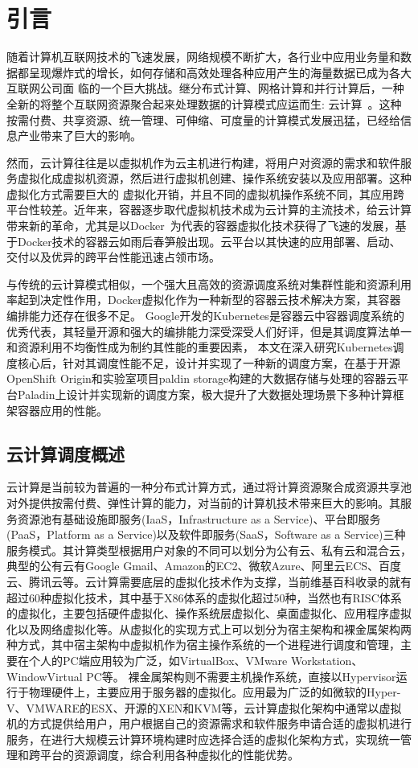 \chapter{引言}
随着计算机互联网技术的飞速发展，网络规模不断扩大，各行业中应用业务量和数据都呈现爆炸式的增长，如何存储和高效处理各种应用产生的海量数据已成为各大互联网公司面
临的一个巨大挑战。继分布式计算、网格计算和并行计算后，一种全新的将整个互联网资源聚合起来处理数据的计算模式应运而生: 云计算~\cite{Hayes2008Cloud}。这种按需付费、共享资源、统一管理、可伸缩、可度量的计算模式发展迅猛，已经给信息产业带来了巨大的影响。

然而，云计算往往是以虚拟机作为云主机进行构建，将用户对资源的需求和软件服务虚拟化成虚拟机资源，然后进行虚拟机创建、操作系统安装以及应用部署。这种虚拟化方式需要巨大的
虚拟化开销，并且不同的虚拟机操作系统不同，其应用跨平台性较差。近年来，容器逐步取代虚拟机技术成为云计算的主流技术，给云计算带来新的革命，尤其是以Docker~\cite{2015Docker}为代表的容器虚拟化技术获得了飞速的发展，基于Docker技术的容器云如雨后春笋般出现。云平台以其快速的应用部署、启动、交付以及优异的跨平台性能迅速占领市场。

与传统的云计算模式相似，一个强大且高效的资源调度系统对集群性能和资源利用率起到决定性作用，Docker虚拟化作为一种新型的容器云技术解决方案，其容器编排能力还存在很多不足。
Google开发的Kubernetes是容器云中容器调度系统的优秀代表，其轻量开源和强大的编排能力深受深受人们好评，但是其调度算法单一和资源利用不均衡性成为制约其性能的重要因素，
本文在深入研究Kubernetes调度核心后，针对其调度性能不足，设计并实现了一种新的调度方案，在基于开源OpenShift Origin和实验室项目paldin storage构建的大数据存储与处理的容器云平台Paladin上设计并实现新的调度方案，极大提升了大数据处理场景下多种计算框架容器应用的性能。

\section{云计算调度概述}
云计算是当前较为普遍的一种分布式计算方式，通过将计算资源聚合成资源共享池对外提供按需付费、弹性计算的能力，对当前的计算机技术带来巨大的影响。其服务资源池有基础设施即服务(IaaS，Infrastructure as a Service)、平台即服务(PaaS，Platform as a Service)以及软件即服务(SaaS，Software as a Service)三种服务模式。其计算类型根据用户对象的不同可以划分为公有云、私有云和混合云，典型的公有云有Google Gmail、Amazon的EC2、微软Azure、阿里云ECS、百度云、腾讯云等。云计算需要底层的虚拟化技术作为支撑，当前维基百科收录的就有超过60种虚拟化技术，其中基于X86体系的虚拟化超过50种，当然也有RISC体系的虚拟化，主要包括硬件虚拟化、操作系统层虚拟化、桌面虚拟化、应用程序虚拟化以及网络虚拟化等。从虚拟化的实现方式上可以划分为宿主架构和裸金属架构两种方式，其中宿主架构中虚拟机作为宿主操作系统的一个进程进行调度和管理，主要在个人的PC端应用较为广泛，如VirtualBox、VMware Workstation、WindowVirtual PC等。
裸金属架构则不需要主机操作系统，直接以Hypervisor运行于物理硬件上，主要应用于服务器的虚拟化。应用最为广泛的如微软的Hyper-V、VMWARE的ESX、开源的XEN和KVM等，云计算虚拟化架构中通常以虚拟机的方式提供给用户，用户根据自己的资源需求和软件服务申请合适的虚拟机进行服务，在进行大规模云计算环境构建时应选择合适的虚拟化架构方式，实现统一管理和跨平台的资源调度，综合利用各种虚拟化的性能优势。

